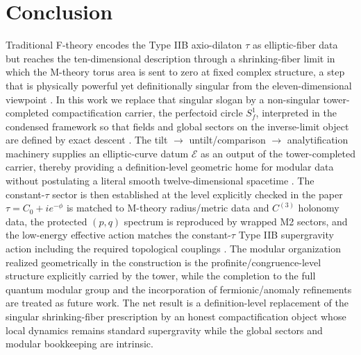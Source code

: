 \documentclass[11pt]{article}
\theoremstyle{remark}
\newcommand{\calE}{\mathcal{E}}
\begin{document}
\section{Conclusion}\label{sec:Conclusion} 
Traditional F-theory encodes the Type IIB axio-dilaton \(\tau\) as elliptic-fiber data but reaches the ten-dimensional description through a shrinking-fiber limit in which the M-theory torus area is sent to zero at fixed complex structure, a step that is physically powerful yet definitionally singular from the eleven-dimensional viewpoint \cite{Vafa1996, MorrisonVafa1996a, MorrisonVafa1996b, DasguptaMukhi1996}. In this work we replace that singular slogan by a non-singular tower-completed compactification carrier, the perfectoid circle \(S_f^{1}\), interpreted in the condensed framework so that fields and global sectors on the inverse-limit object are defined by exact descent \cite{ClausenScholze, Scholze2012}. The tilt \(\to\) untilt/comparison \(\to\) analytification machinery supplies an elliptic-curve datum \(\calE\) as an output of the tower-completed carrier, thereby providing a definition-level geometric home for modular data without postulating a literal smooth twelve-dimensional spacetime \cite{Scholze2012, ScholzeWeinstein2017}. The constant-\(\tau\) sector is then established at the level explicitly checked in the paper\:\(\tau=C_{0}+ie^{-\phi}\) is matched to M-theory radius/metric data and \(C^{(3)}\) holonomy data, the protected \((p,q)\) spectrum is reproduced by wrapped M2 sectors, and the low-energy effective action matches the constant-\(\tau\) Type IIB supergravity action including the required topological couplings \cite{Schwarz1995, Schwarz1983}. The modular organization realized geometrically in the construction is the profinite/congruence-level structure explicitly carried by the tower, while the completion to the full quantum modular group and the incorporation of fermionic/anomaly refinements are treated as future work. The net result is a definition-level replacement of the singular shrinking-fiber prescription by an honest compactification object whose local dynamics remains standard supergravity while the global sectors and modular bookkeeping are intrinsic.
\end{document}
